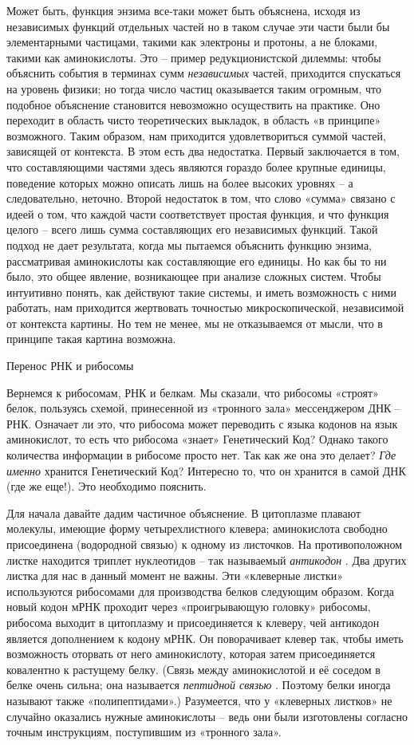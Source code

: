 \documentclass[../main.tex]{subfiles}
\begin{document}
Может быть, функция энзима все-таки может быть объяснена, исходя из независимых функций отдельных частей но в таком случае эти части были бы элементарными частицами, такими как электроны и протоны, а не блоками, такими как аминокислоты. Это \--- пример редукционистской дилеммы: чтобы объяснить события в терминах сумм \emph{независимых} частей, приходится спускаться на уровень физики; но тогда число частиц оказывается таким огромным, что подобное объяснение становится невозможно осуществить на практике. Оно переходит в область чисто теоретических выкладок, в область «в принципе» возможного. Таким образом, нам приходится удовлетвориться суммой частей, зависящей от контекста. В этом есть два недостатка. Первый заключается в том, что составляющими частями здесь являются гораздо более крупные единицы, поведение которых можно описать лишь на более высоких уровнях \--- а следовательно, неточно. Второй недостаток в том, что слово «сумма» связано с идеей о том, что каждой части соответствует простая функция, и что функция целого \--- всего лишь сумма составляющих его независимых функций. Такой подход не дает результата, когда мы пытаемся объяснить функцию энзима, рассматривая аминокислоты как составляющие его единицы. Но как бы то ни было, это общее явление, возникающее при анализе сложных систем. Чтобы интуитивно понять, как действуют такие системы, и иметь возможность с ними работать, нам приходится жертвовать точностью микроскопической, независимой от контекста картины. Но тем не менее, мы не отказываемся от мысли, что в принципе такая картина возможна.

Перенос РНК и рибосомы

Вернемся к рибосомам, РНК и белкам. Мы сказали, что рибосомы «строят» белок, пользуясь схемой, принесенной из «тронного зала» мессенджером ДНК \--- РНК\@. Означает ли это, что рибосома может переводить с языка кодонов на язык аминокислот, то есть что рибосома «знает» Генетический Код? Однако такого количества информации в рибосоме просто нет. Так как же она это делает? \emph{Где именно} хранится Генетический Код? Интересно то, что он хранится в самой ДНК (где же еще!). Это необходимо пояснить.

Для начала давайте дадим частичное объяснение. В цитоплазме плавают молекулы, имеющие форму четырехлистного клевера; аминокислота свободно присоединена (водородной связью) к одному из листочков. На противоположном листке находится триплет нуклеотидов \--- так называемый \emph{антикодон} . Два других листка для нас в данный момент не важны. Эти «клеверные листки» используются рибосомами для производства белков следующим образом. Когда новый кодон мРНК проходит через «проигрывающую головку» рибосомы, рибосома выходит в цитоплазму и присоединяется к клеверу, чей антикодон является дополнением к кодону мРНК\@. Он поворачивает клевер так, чтобы иметь возможность оторвать от него аминокислоту, которая затем присоединяется ковалентно к растущему белку. (Связь между аминокислотой и её соседом в белке очень сильна; она называется \emph{пептидной связью} . Поэтому белки иногда называют также «полипептидами».) Разумеется, что у «клеверных листков» не случайно оказались нужные аминокислоты \--- ведь они были изготовлены согласно точным инструкциям, поступившим из «тронного зала».
\end{document}
